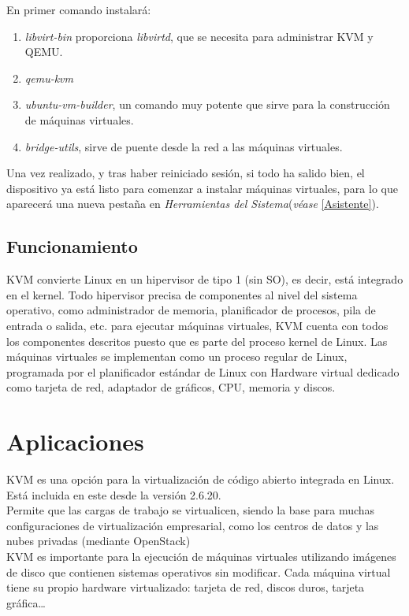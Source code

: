 \documentclass[11pt]{article}
\begin{document}
En primer comando instalará:
\begin{enumerate}
\item \textit{libvirt-bin} proporciona \textit{libvirtd}, que se necesita para administrar KVM y QEMU. 
\item \textit{qemu-kvm}
\item \textit{ubuntu-vm-builder}, un comando muy potente que sirve para la construcción de máquinas virtuales.
\item \textit{bridge-utils}, sirve de puente desde la red a las máquinas virtuales.
\end{enumerate}

Una vez realizado, y tras haber reiniciado sesión, si todo ha salido bien, el dispositivo ya está listo para comenzar a instalar máquinas virtuales, para lo que aparecerá una nueva pestaña en \textit{Herramientas del Sistema}(\textit{véase} \ref{Asistente}).



\subsection{Funcionamiento}
KVM convierte Linux en un hipervisor de tipo 1 (sin SO), es decir, está integrado en el kernel. Todo hipervisor precisa de componentes al nivel del sistema operativo, como administrador de memoria, planificador de procesos, pila de entrada o salida, etc. para ejecutar máquinas virtuales, KVM cuenta con todos los componentes descritos puesto que es parte del proceso kernel de Linux. Las máquinas virtuales se implementan como un proceso regular de Linux, programada por el planificador estándar de Linux con Hardware virtual dedicado como tarjeta de red, adaptador de gráficos, CPU, memoria y discos.

\section{Aplicaciones}
KVM es una opción para la virtualización de código abierto integrada en Linux. Está incluida en este desde la versión 2.6.20. \\

Permite que las cargas de trabajo se virtualicen, siendo la base para muchas configuraciones de virtualización empresarial, como los centros de datos y las nubes privadas (mediante OpenStack) \\

KVM es importante para la ejecución de máquinas virtuales utilizando imágenes de disco que contienen sistemas operativos sin modificar. Cada máquina virtual tiene su propio hardware virtualizado: tarjeta de red, discos duros, tarjeta gráfica\ldots \\
\end{document}
